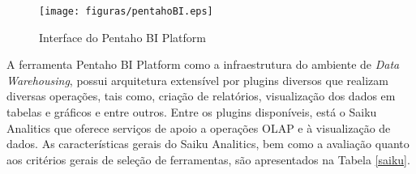 \begin{figure}[ht!]
\centering
\texttt{[image: figuras/pentahoBI.eps]}
\caption{Interface do Pentaho BI Platform}
\label{BIplatform}
\end{figure}
\FloatBarrier
 

A ferramenta Pentaho BI Platform como a infraestrutura do ambiente de \textit{Data Warehousing}, possui arquitetura extensível por plugins diversos que realizam diversas operações, tais como, criação de relatórios, visualização dos dados em tabelas e gráficos e entre outros. Entre os plugins disponíveis, está o Saiku Analitics que oferece serviços de apoio a operações OLAP e à visualização de dados. As características gerais do Saiku Analitics, bem como a avaliação quanto aos critérios gerais de seleção de ferramentas, são apresentados na Tabela \ref{saiku}. 

